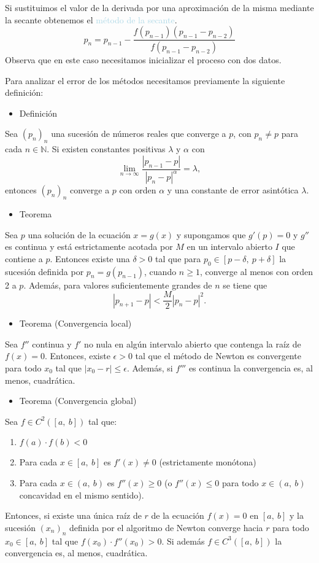 Si sustituimos el valor de la derivada por una aproximación de la misma mediante la secante obtenemos el \textcolor{lightblue}{método de la secante}. \[ p_n=p_{n-1}-\dfrac{f(p_{n-1})(p_{n-1}-p_{n-2})}{f(p_{n-1}-p_{n-2})} \]
Observa que en este caso necesitamos inicializar el proceso con dos datos.

Para analizar el error de los métodos necesitamos previamente la siguiente definición:
\begin{itemize}[label=\color{red}\textbullet, leftmargin=*]
	\item \color{lightblue}Definición
\end{itemize}
Sea $(p_n)_n$ una sucesión de números reales que converge a $p$, con $p_n\neq p$ para cada $n\in\mathbb{N}$. Si existen constantes positivas $\lambda$ y $\alpha$ con \[ \lim_{n\to\infty}\dfrac{|p_{n-1}-p|}{|p_n-p|^\alpha}=\lambda, \] entonces $(p_n)_n$ converge a $p$ con orden $\alpha$ y una constante de error asintótica $\lambda$.
\begin{itemize}[label=\color{red}\textbullet, leftmargin=*]
	\item \color{lightblue}Teorema
\end{itemize}
Sea $p$ una solución de la ecuación $x=g(x)$ y supongamos que $g'(p)=0$ y $g''$ es continua y está estrictamente acotada por $M$ en un intervalo abierto $I$ que contiene a $p$. Entonces existe una $\delta>0$ tal que para $p_0\in[p-\delta,~p+\delta]$ la sucesión definida por $p_n=g(p_{n-1})$, cuando $n\ge1$, converge al menos con orden 2 a $p$. Además, para valores suficientemente grandes de $n$ se tiene que \[ |p_{n+1}-p|<\dfrac{M}{2}|p_n-p|^2. \]
\begin{itemize}[label=\color{red}\textbullet, leftmargin=*]
	\item \color{lightblue}Teorema (Convergencia local)
\end{itemize}
Sea $f''$ continua y $f'$ no nula en algún intervalo abierto que contenga la raíz de $f(x)=0$. Entonces, existe $\epsilon>0$ tal que el método de Newton es convergente para todo $x_0$ tal que $|x_0-r|\le\epsilon$. Además, si $f'''$ es continua la convergencia es, al menos, cuadrática.
\begin{itemize}[label=\color{red}\textbullet, leftmargin=*]
	\item \color{lightblue}Teorema (Convergencia global)
\end{itemize}
Sea $f\in C^2([a,~b])$ tal que:
\begin{enumerate}[label=\arabic*)]
	\item $f(a)\cdot f(b)<0$
	\item Para cada $x\in[a,~b]$ es $f'(x)\neq0$ (estrictamente monótona)
	\item Para cada $x\in(a,~b)$ es $f''(x)\ge0$ (o $f''(x)\le0$ para todo $x\in(a,~b)$ concavidad en el mismo sentido).
\end{enumerate}
Entonces, si existe una única raíz de $r$ de la ecuación $f(x)=0$ en $[a,~b]$ y la sucesión $(x_n)_n$ definida por el algoritmo  de Newton converge hacia $r$ para todo $x_0\in[a,~b]$ tal que $f(x_0)\cdot f''(x_0)>0$. Si además $f\in C^3([a,~b])$ la convergencia es, al menos, cuadrática.